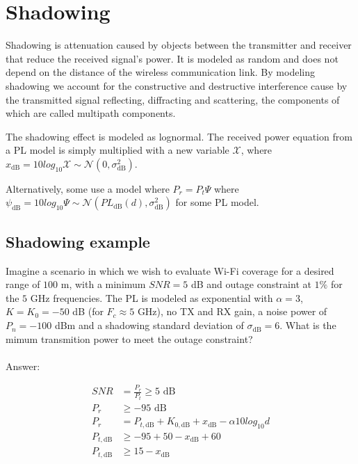 \documentclass[12pt]{report} %
\begin{document}
\section{Shadowing}
Shadowing is attenuation caused by objects between the transmitter and receiver
that reduce the received signal's power. It is modeled as random and does not
depend on the distance of the wireless communication link. By modeling shadowing
we account for the constructive and destructive interference cause by the
transmitted signal reflecting, diffracting and scattering, the components of
which are called multipath components.

The shadowing effect is modeled as lognormal. The received power equation from a
\gls{PL} model is simply multiplied with a new variable $\mathcal{X}$, where
$x_{\text{dB}} = 10 log_{10}{\mathcal{X}} \sim
  \mathcal{N}(0,\sigma_{\text{dB}}^2)$.

Alternatively, some use a model where $P_r = P_t \Psi$ where $ \psi_{\text{dB}}
  = 10 log_{10}{\Psi}  \sim \mathcal{N}(PL_{\text{dB}}(d),\sigma_{\text{dB}}^2)$
for some \gls{PL} model.

\subsection*{Shadowing example}
Imagine a scenario in which we wish to evaluate Wi-Fi coverage for a desired
range of $100$ m, with a minimum $SNR = 5$ dB and outage constraint at $1\%$ for
the $5$ GHz frequencies. The \gls{PL} is modeled as exponential with $\alpha =
  3$, $K = K_0 = -50$ dB (for $F_c \approx 5$ GHz), no TX and RX gain, a noise
power of $P_n = -100$ dBm and a shadowing standard deviation of
$\sigma_{\text{dB}} = 6$. What is the mimum transmition power to meet the outage
constraint?
\\
\\
Answer:

\begin{align}
  SNR             & = \frac{P_r}{P_t} \geq 5 \text{ dB} \nonumber                                       \\
  P_r             & \geq -95 \text{ dB} \nonumber                                                       \\
  P_r             & = P_{t,\text{dB}} + K_{0,\text{dB}} + x_{\text{dB}} - \alpha 10 log_{10}d \nonumber \\
  P_{t,\text{dB}} & \geq -95 + 50 - x_{\text{dB}} + 60 \nonumber                                        \\
  P_{t,\text{dB}} & \geq 15 - x_{\text{dB}} \nonumber
\end{align}
\end{document}

